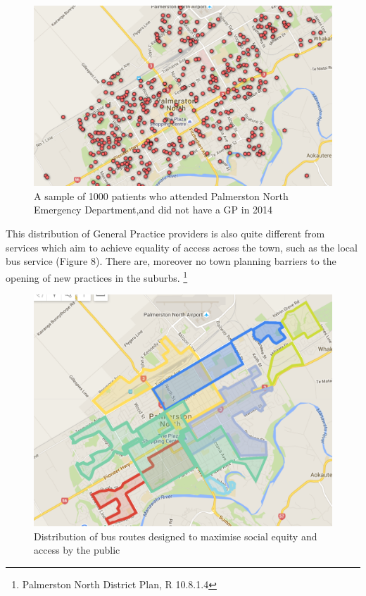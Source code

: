 \documentclass[11pt,a4paper]{article}
\begin{document}
\begin{figure}[htp]
\centering
\includegraphics[scale=0.30]{fig8.png}
\caption{A sample of 1000 patients who attended Palmerston North Emergency Department,and did not have a GP in 2014}
\label{Distribution of patients with a General Practitioner}
\end{figure}


This distribution of General Practice providers is also quite different from services which aim to achieve equality of access across the town, such as the local bus service (Figure 8). There are, moreover no town planning barriers to the opening of new practices in the suburbs. \footnote{Palmerston North District Plan, R 10.8.1.4}  \\


\begin{figure}[htp]
\centering
\includegraphics[scale=0.3]{fig9.png}
\caption{Distribution of bus routes designed to maximise social equity and access by the public}
\label{Bus routes designed to maximise equity of access}
\end{figure}
\end{document}
